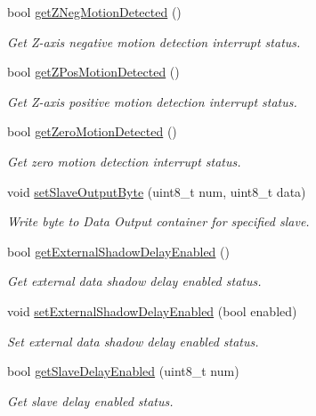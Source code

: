 \begin{DoxyCompactItemize}
bool \mbox{\hyperlink{classMPU6050_a3601b732eb15644212b8f29cf396e142}{get\+Z\+Neg\+Motion\+Detected}} ()
\begin{DoxyCompactList}\small\item\em Get Z-\/axis negative motion detection interrupt status. \end{DoxyCompactList}\item 
bool \mbox{\hyperlink{classMPU6050_a33c766cd415fc5780417b1ed76717875}{get\+Z\+Pos\+Motion\+Detected}} ()
\begin{DoxyCompactList}\small\item\em Get Z-\/axis positive motion detection interrupt status. \end{DoxyCompactList}\item 
bool \mbox{\hyperlink{classMPU6050_a384765351b5c4bd2b6efec9ed71ad1b7}{get\+Zero\+Motion\+Detected}} ()
\begin{DoxyCompactList}\small\item\em Get zero motion detection interrupt status. \end{DoxyCompactList}\item 
void \mbox{\hyperlink{classMPU6050_a34a1def575f6abcd464afe954de8a461}{set\+Slave\+Output\+Byte}} (uint8\+\_\+t num, uint8\+\_\+t data)
\begin{DoxyCompactList}\small\item\em Write byte to Data Output container for specified slave. \end{DoxyCompactList}\item 
bool \mbox{\hyperlink{classMPU6050_a0e5cb13838298609b5260fd1558f8c92}{get\+External\+Shadow\+Delay\+Enabled}} ()
\begin{DoxyCompactList}\small\item\em Get external data shadow delay enabled status. \end{DoxyCompactList}\item 
void \mbox{\hyperlink{classMPU6050_a9160193d883871037c6535a9d3e02ee2}{set\+External\+Shadow\+Delay\+Enabled}} (bool enabled)
\begin{DoxyCompactList}\small\item\em Set external data shadow delay enabled status. \end{DoxyCompactList}\item 
bool \mbox{\hyperlink{classMPU6050_ae84fd795630f9ab5e8d6b19a616a11ce}{get\+Slave\+Delay\+Enabled}} (uint8\+\_\+t num)
\begin{DoxyCompactList}\small\item\em Get slave delay enabled status. \end{DoxyCompactList}\item 

\end{DoxyCompactItemize}
